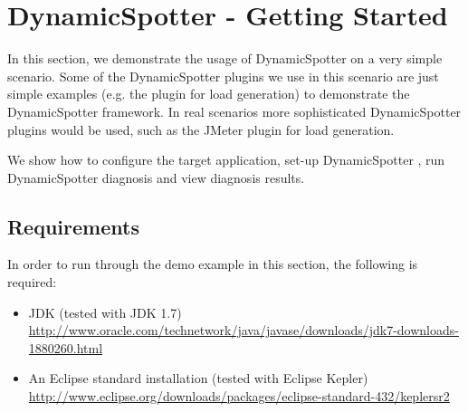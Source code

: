 \documentclass{report}
\newcommand{\DS}{DynamicSpotter }
\newcommand{\link}[1]{\textcolor[rgb]{0.0,0.0,1.0}{\href{#1}{#1}}}
\begin{document}
\newpage
\section{DynamicSpotter - Getting Started}
In this section, we demonstrate the usage of \DS on a very simple scenario. Some of the \DS plugins we use in this
scenario are just simple examples (e.g. the plugin for load generation) to demonstrate the \DS framework. In real
scenarios more sophisticated \DS plugins would be used, such as the JMeter plugin for load generation.

We show how to configure the target application, set-up \DS, run \DS diagnosis and view diagnosis
results.


\subsection{Requirements}
In order to run through the demo example in this section, the following is required:
\begin{itemize}
  \item JDK (tested with JDK 1.7)
  \\ \link{http://www.oracle.com/technetwork/java/javase/downloads/jdk7-downloads-1880260.html}
  \item An Eclipse standard installation (tested with Eclipse Kepler) 
  \\ \link{http://www.eclipse.org/downloads/packages/eclipse-standard-432/keplersr2}
\end{itemize}
\end{document}
